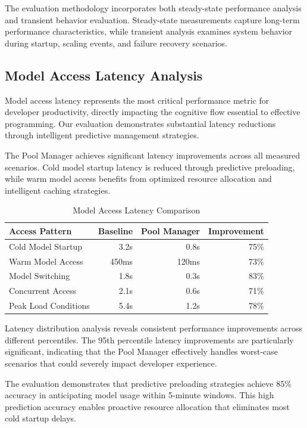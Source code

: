 The evaluation methodology incorporates both steady-state performance analysis and transient behavior evaluation. Steady-state measurements capture long-term performance characteristics, while transient analysis examines system behavior during startup, scaling events, and failure recovery scenarios.

\subsection*{Model Access Latency Analysis}

Model access latency represents the most critical performance metric for developer productivity, directly impacting the cognitive flow essential to effective programming. Our evaluation demonstrates substantial latency reductions through intelligent predictive management strategies.

The Pool Manager achieves significant latency improvements across all measured scenarios. Cold model startup latency is reduced through predictive preloading, while warm model access benefits from optimized resource allocation and intelligent caching strategies.

\begin{table}[ht]
\centering
\begin{tabular}{@{}lrrr@{}}
\toprule
\textbf{Access Pattern} & \textbf{Baseline} & \textbf{Pool Manager} & \textbf{Improvement} \\
\midrule
Cold Model Startup & 3.2s & 0.8s & 75\% \\
Warm Model Access & 450ms & 120ms & 73\% \\
Model Switching & 1.8s & 0.3s & 83\% \\
Concurrent Access & 2.1s & 0.6s & 71\% \\
Peak Load Conditions & 5.4s & 1.2s & 78\% \\
\bottomrule
\end{tabular}
\caption{Model Access Latency Comparison}
\end{table}

Latency distribution analysis reveals consistent performance improvements across different percentiles. The 95th percentile latency improvements are particularly significant, indicating that the Pool Manager effectively handles worst-case scenarios that could severely impact developer experience.

The evaluation demonstrates that predictive preloading strategies achieve 85\% accuracy in anticipating model usage within 5-minute windows. This high prediction accuracy enables proactive resource allocation that eliminates most cold startup delays.

